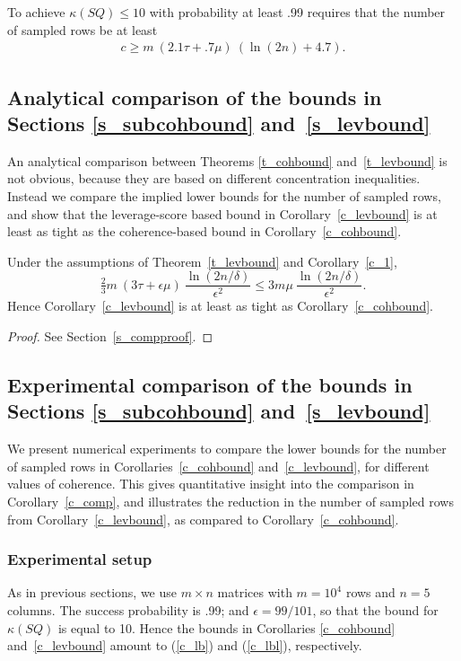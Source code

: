 \documentclass{siamltex}
\begin{document}
To achieve $\kappa(SQ)\leq 10$ with probability at least .99
requires that the number of sampled rows be at least
\begin{eqnarray}\label{c_lbl}
c\geq m\>(2.1\tau+.7\mu)\>\left(\ln(2n)+4.7\right).
\end{eqnarray}

\subsection{Analytical comparison of the bounds in Sections \ref{s_subcohbound}
and~\ref{s_levbound}}\label{s_ancomp}
An analytical comparison between Theorems \ref{t_cohbound} 
and~\ref{t_levbound} is not obvious, because they are based on different
concentration inequalities. Instead we compare the implied lower 
bounds for the number of sampled rows, and show that the
leverage-score based bound in Corollary~\ref{c_levbound}
is at least as tight as the coherence-based bound in Corollary~\ref{c_cohbound}.

\begin{corollary}\label{c_comp}
Under the assumptions of Theorem~\ref{t_levbound} and Corollary~\ref{c_1},
$$\tfrac{2}{3}m\>(3\tau+\epsilon\mu)\>
\frac{\ln(2n/\delta)}{\epsilon^2}\leq 
3m\mu\>\frac{\ln(2n/\delta)}{\epsilon^2}.$$
Hence Corollary~\ref{c_levbound} is at least as tight as
Corollary~\ref{c_cohbound}.
\end{corollary}

\begin{proof} See Section~\ref{s_compproof}.
\end{proof}

\subsection{Experimental comparison of the bounds in Sections 
\ref{s_subcohbound} and~\ref{s_levbound}}\label{s_numcomp}
We present numerical experiments to compare the lower bounds for the number 
of sampled rows in 
Corollaries~\ref{c_cohbound} and~\ref{c_levbound}, 
for different values of coherence. This gives quantitative insight
into the comparison in Corollary~\ref{c_comp}, and illustrates the 
reduction in the number of sampled rows from
Corollary~\ref{c_levbound}, as compared to Corollary~\ref{c_cohbound}.

\subsubsection*{Experimental setup}
As in previous sections, we use $m\times n$ matrices with
$m=10^4$ rows and $n=5$ columns. The success
probability is .99; and $\epsilon=99/101$, so that the bound for
$\kappa(SQ)$ is equal to 10. Hence the bounds in Corollaries
\ref{c_cohbound} and~\ref{c_levbound}  amount to (\ref{c_lb}) and
(\ref{c_lbl}), respectively.
\end{document}
